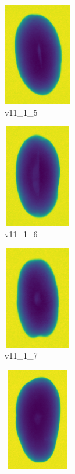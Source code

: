 \documentclass[11pt]{article}
\begin{document}
\begin{figure}
    
         \begin{subfigure}[b]{0.15\textwidth}
         \centering
         \includegraphics[width=3cm, height=4.5cm]{images/kartofler/v11_1_5_cut.png}
         \caption{v11\_1\_5}
         \label{fig:y equals x}
     \end{subfigure}
     \hfill
     \begin{subfigure}[b]{0.15\textwidth}
         \centering
         \includegraphics[width=3cm, height=4.5cm]{images/kartofler/v11_1_6_cut.png}
        \caption{v11\_1\_6}
         \label{fig:three sin x}
     \end{subfigure}
     \hfill
     \begin{subfigure}[b]{0.15\textwidth}
         \centering
         \includegraphics[width=3cm, height=4.5cm]{images/kartofler/v11_1_7_cut.png}
        \caption{v11\_1\_7}
         \label{fig:five over x}
     \end{subfigure}
     \hfill
    \begin{subfigure}[b]{0.15\textwidth}
         \centering
         \includegraphics[width=3cm, height=4.5cm]{images/kartofler/v11_1_8_cut.png}

\end{subfigure}
\end{figure}
\end{document}
